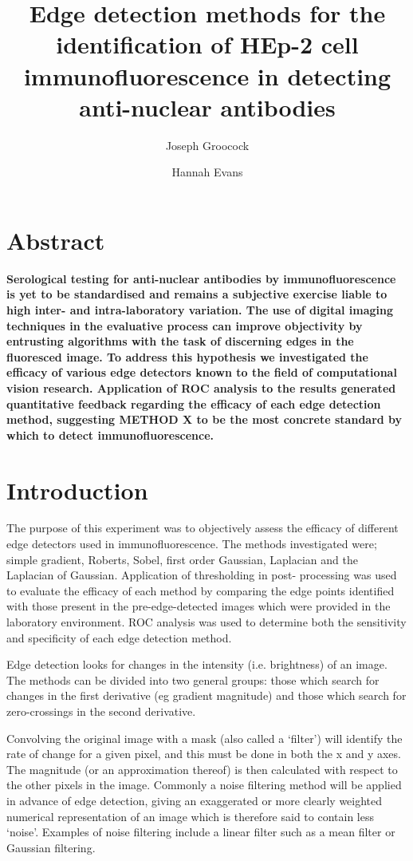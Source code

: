 \documentclass[a4paper]{article}
\title {\vspace{-3ex}Edge detection methods for the identification of HEp-2 cell immunofluorescence in detecting anti-nuclear antibodies}
\author {Joseph Groocock \and Hannah Evans}
\begin{document}
\maketitle
\begin{multicols*}{2}


\section*{Abstract}
\textbf{Serological testing for anti-nuclear antibodies by immunofluorescence is yet to be standardised and remains a subjective exercise liable to high inter- and intra-laboratory variation. The use of digital imaging techniques in the evaluative process can improve objectivity by entrusting algorithms with the task of discerning edges in the fluoresced image. To address this hypothesis we investigated the efficacy of various edge detectors known to the field of computational vision research. Application of ROC analysis to the results generated quantitative feedback regarding the efficacy of each edge detection method, suggesting METHOD X to be the most concrete standard by which to detect immunofluorescence.}

\section*{Introduction}

The purpose of this experiment was to objectively assess the efficacy of different edge detectors used in immunofluorescence. The methods investigated were; simple gradient, Roberts, Sobel, first order Gaussian, Laplacian and the Laplacian of Gaussian. Application of thresholding in post- processing was used to evaluate the efficacy of each method by comparing the edge points identified with those present in the pre-edge-detected images which were provided in the laboratory environment. ROC analysis was used to determine both the sensitivity and specificity of each edge detection method. 

Edge detection looks for changes in the intensity (i.e. brightness) of an image. The methods can be divided into two general groups: those which search for changes in the first derivative (eg gradient magnitude) and those which search for zero-crossings in the second derivative. 

Convolving the original image with a mask (also called a ‘filter’) will identify the rate of change for a given pixel, and this must be done in both the x and y axes. The magnitude (or an approximation thereof) is then calculated with respect to the other pixels in the image. Commonly a noise filtering method will be applied in advance of edge detection, giving an exaggerated or more clearly weighted numerical representation of an image which is therefore said to contain less ‘noise’. Examples of noise filtering include a linear filter such as a mean filter or Gaussian filtering.


\end{multicols*}
\end{document}
